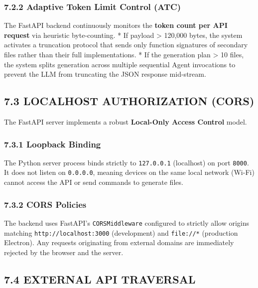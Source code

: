 \documentclass[
  12pt,
]{article}
\begin{document}
\subsubsection{7.2.2 Adaptive Token Limit Control
(ATC)}\label{adaptive-token-limit-control-atc}

The FastAPI backend continuously monitors the \textbf{token count per
API request} via heuristic byte-counting. * If payload \textgreater{}
120,000 bytes, the system activates a truncation protocol that sends
only function signatures of secondary files rather than their full
implementations. * If the generation plan \textgreater{} 10 files, the
system splits generation across multiple sequential Agent invocations to
prevent the LLM from truncating the JSON response mid-stream.

\subsection{7.3 LOCALHOST AUTHORIZATION
(CORS)}\label{localhost-authorization-cors}

The FastAPI server implements a robust \textbf{Local-Only Access
Control} model.

\subsubsection{7.3.1 Loopback Binding}\label{loopback-binding}

The Python server process binds strictly to \texttt{127.0.0.1}
(localhost) on port \texttt{8000}. It does not listen on
\texttt{0.0.0.0}, meaning devices on the same local network (Wi-Fi)
cannot access the API or send commands to generate files.

\subsubsection{7.3.2 CORS Policies}\label{cors-policies}

The backend uses FastAPI's \texttt{CORSMiddleware} configured to
strictly allow origins matching \texttt{http://localhost:3000}
(development) and \texttt{file://*} (production Electron). Any requests
originating from external domains are immediately rejected by the
browser and the server.

\subsection{7.4 EXTERNAL API TRAVERSAL}\label{external-api-traversal}
\end{document}
